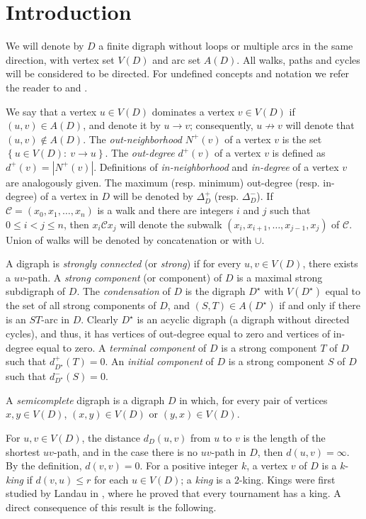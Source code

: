 \documentclass[preprint]{elsarticle}
\begin{document}
\section{Introduction}

We will denote by $D$ a finite digraph without loops or multiple arcs in the same direction, with vertex set $V(D)$ and arc set $A(D)$.   All walks, paths and cycles will be considered to be directed.   For undefined concepts and notation we refer the reader to \cite{BJD} and \cite{BM}.

We say that a vertex $u \in V(D)$ dominates a vertex $v \in V(D)$ if $(u,v) \in A(D)$, and denote it by $u \to v$; consequently, $u \not \to v$ will denote that $(u,v) \notin A(D)$.   The \emph{out-neighborhood} $N^+(v)$ of a vertex $v$ is the set $\left\{ u \in V(D) \colon\ v \to u \right\}$.   The \emph{out-degree} $d^+(v)$ of a vertex $v$ is defined as $d^+(v) = | N^+(v) |$.  Definitions of \emph{in-neighborhood} and \emph{in-degree} of a vertex $v$ are analogously given.   The maximum (resp. minimum) out-degree (resp. in-degree) of a vertex in $D$ will be denoted by $\Delta^+_D$ (resp. $\Delta^-_D$).   If $\mathscr{C} = (x_0, x_1, \dots, x_n)$ is a walk and there are integers $i$ and $j$ such that $0 \le i < j \le n$, then $x_i \mathscr{C} x_j$ will denote the subwalk $(x_i, x_{i+1}, \dots, x_{j-1}, x_j)$ of $\mathscr{C}$.   Union of walks will be denoted by concatenation or with $\cup$.

A digraph is \emph{strongly connected} (or \emph{strong}) if for every $u,v \in V(D)$, there exists a $uv$-path.   A \emph{strong component} (or component) of $D$ is a maximal strong subdigraph of $D$.   The \emph{condensation} of $D$ is the digraph $D^\star$ with $V(D^\star)$ equal to the set of all strong components of $D$, and $(S,T) \in A(D^\star)$ if and only if there is an $ST$-arc in $D$.   Clearly $D^\star$ is an acyclic digraph (a digraph without directed cycles), and thus, it has vertices of out-degree equal to zero and vertices of in-degree equal to zero.   A \emph{terminal component} of $D$ is a strong component $T$ of $D$ such that $d_{D^\star}^+ (T) = 0$.  An \emph{initial component} of $D$ is a strong component $S$ of $D$ such that $d_{D^\star}^- (S)=0$.

A \emph{semicomplete} digraph is a digraph $D$ in which, for every pair of vertices $x, y \in V(D)$, $(x,y) \in V(D)$ or $(y,x) \in V(D)$.

For $u,v \in V(D)$, the distance $d_D (u,v)$ from $u$ to $v$ is the length of the shortest $uv$-path, and in the case there is no $uv$-path in $D$, then $d(u,v) = \infty$.   By the definition, $d(v,v) = 0$.   For a positive integer $k$, a vertex $v$ of $D$ is a $k$-\emph{king} if $d(v,u) \le r$ for each $u \in V(D)$; a \emph{king} is a $2$-king.   Kings were first studied by Landau in \cite{L}, where he proved that every tournament has a king.   A direct consequence of this result is the following.
\end{document}
